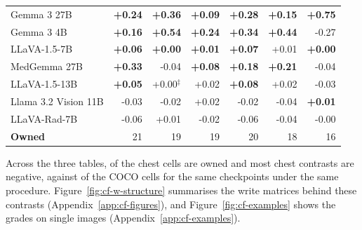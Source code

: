 \documentclass{article}
\begin{document}
\begin{table}[htbp]
{\begin{tabular}{lrrrrrr}
Gemma 3 27B & \cellcolor{cfTerra3}\textbf{+0.24} & \cellcolor{cfTerra4}\textbf{+0.36} & \cellcolor{cfTerra2}\textbf{+0.09} & \cellcolor{cfTerra4}\textbf{+0.28} & \cellcolor{cfTerra3}\textbf{+0.15} & \cellcolor{cfTerra4}\textbf{+0.75} \\
Gemma 3 4B & \cellcolor{cfTerra3}\textbf{+0.16} & \cellcolor{cfTerra4}\textbf{+0.54} & \cellcolor{cfTerra3}\textbf{+0.24} & \cellcolor{cfTerra4}\textbf{+0.34} & \cellcolor{cfTerra4}\textbf{+0.44} & \cellcolor{cfSlate4}-0.27 \\
LLaVA-1.5-7B & \cellcolor{cfTerra2}\textbf{+0.06} & \cellcolor{cfTerra1}\textbf{+0.00} & \cellcolor{cfTerra1}\textbf{+0.01} & \cellcolor{cfTerra2}\textbf{+0.07} & \cellcolor{cfTerra1}+0.01 & \cellcolor{cfTerra1}\textbf{+0.00} \\
MedGemma 27B & \cellcolor{cfTerra4}\textbf{+0.33} & \cellcolor{cfSlate2}-0.04 & \cellcolor{cfTerra2}\textbf{+0.08} & \cellcolor{cfTerra3}\textbf{+0.18} & \cellcolor{cfTerra3}\textbf{+0.21} & \cellcolor{cfSlate2}-0.04 \\
LLaVA-1.5-13B & \cellcolor{cfTerra2}\textbf{+0.05} & \cellcolor{cfTerra1}+0.00$^{\ddagger}$ & \cellcolor{cfTerra1}+0.02 & \cellcolor{cfTerra2}\textbf{+0.08} & \cellcolor{cfTerra1}+0.02 & \cellcolor{cfSlate2}-0.03 \\
Llama 3.2 Vision 11B & \cellcolor{cfSlate2}-0.03 & \cellcolor{cfSlate2}-0.02 & \cellcolor{cfTerra2}+0.02 & \cellcolor{cfSlate1}-0.02 & \cellcolor{cfSlate2}-0.04 & \cellcolor{cfTerra1}\textbf{+0.01} \\
LLaVA-Rad-7B & \cellcolor{cfSlate2}-0.06 & \cellcolor{cfTerra1}+0.01 & \cellcolor{cfSlate2}-0.02 & \cellcolor{cfSlate2}-0.06 & \cellcolor{cfSlate2}-0.04 & \cellcolor{cfSlate1}-0.00 \\
\midrule
\textbf{Owned} & 21 & 19 & 19 & 20 & 18 & 16 \\
\bottomrule
\end{tabular}}
\end{table}

\FloatBarrier

Across the three tables, \cfChestOwned{} of the \cfChestCellsN{} chest cells are owned and most chest contrasts are negative, against \cfCocoOwned{} of the \cfCocoOwnedN{} COCO cells for the same checkpoints under the same procedure. Figure~\ref{fig:cf-w-structure} summarises the write matrices behind these contrasts (Appendix~\ref{app:cf-figures}), and Figure~\ref{fig:cf-examples} shows the grades on single images (Appendix~\ref{app:cf-examples}).
\end{document}
